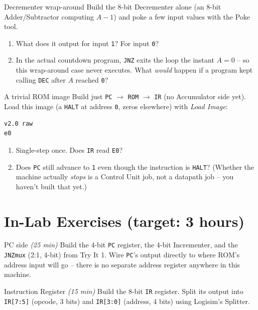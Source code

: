 \documentclass[11pt]{article}
\begin{document}
\begin{tryit}{Decrementer wrap-around}
Build the 8-bit Decrementer alone (an 8-bit Adder/Subtractor computing $A-1$) and
poke a few input values with the Poke tool.
\begin{enumerate}[nosep,leftmargin=*]
  \item What does it output for input \texttt{1}? For input \texttt{0}?
  \item In the actual countdown program, \texttt{JNZ} exits the loop the instant
        $A=0$ -- so this wrap-around case never executes. What \emph{would} happen
        if a program kept calling \texttt{DEC} after $A$ reached \texttt{0}?
\end{enumerate}
\end{tryit}

\begin{tryit}{A trivial ROM image}
Build just \texttt{PC} $\to$ \texttt{ROM} $\to$ \texttt{IR} (no Accumulator side
yet). Load this image (a \texttt{HALT} at address \texttt{0}, zeros elsewhere)
with \emph{Load Image}:
\begin{lstlisting}
v2.0 raw
e0
\end{lstlisting}
\begin{enumerate}[nosep,leftmargin=*]
  \item Single-step once. Does \texttt{IR} read \texttt{E0}?
  \item Does \texttt{PC} still advance to \texttt{1} even though the instruction is
        \texttt{HALT}? (Whether the machine actually \emph{stops} is a Control Unit
        job, not a datapath job -- you haven't built that yet.)
\end{enumerate}
\end{tryit}

\section*{In-Lab Exercises (target: 3 hours)}

\begin{labexercise}{PC side \hfill {\small \itshape (25 min)}}
Build the 4-bit \texttt{PC} register, the 4-bit Incrementer, and the
\texttt{JNZmux} (2:1, 4-bit) from Try It 1. Wire \texttt{PC}'s output directly to
where ROM's address input will go -- there is no separate address register
anywhere in this machine.
\end{labexercise}

\begin{labexercise}{Instruction Register \hfill {\small \itshape (15 min)}}
Build the 8-bit \texttt{IR} register. Split its output into \texttt{IR[7:5]}
(opcode, 3 bits) and \texttt{IR[3:0]} (address, 4 bits) using Logisim's Splitter.
\end{labexercise}
\end{document}

